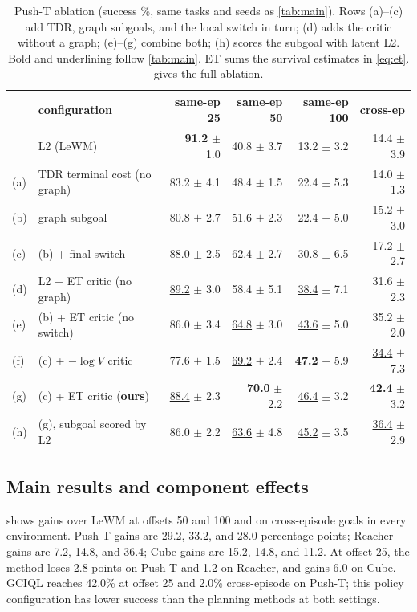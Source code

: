 \documentclass{article}
\theoremstyle{definition}
\theoremstyle{remark}
\begin{document}
\begin{table}[t]
\centering\small\setlength{\tabcolsep}{3pt}
\caption{Push-T ablation (success \%, same tasks and seeds as \cref{tab:main}). Rows (a)--(c) add TDR, graph subgoals, and the local switch in turn; (d) adds the critic without a graph; (e)--(g) combine both; (h) scores the subgoal with latent L2. Bold and underlining follow \cref{tab:main}. ET sums the survival estimates in \cref{eq:et}.  gives the full ablation.}
\label{tab:ablation}
\begin{tabular}{llrrrr}
\toprule
& configuration & same-ep 25 & same-ep 50 & same-ep 100 & cross-ep \\
\midrule
& L2 (LeWM) & \textbf{91.2} $\pm$ 1.0 & 40.8 $\pm$ 3.7 & 13.2 $\pm$ 3.2 & 14.4 $\pm$ 3.9 \\
(a) & TDR terminal cost (no graph) & 83.2 $\pm$ 4.1 & 48.4 $\pm$ 1.5 & 22.4 $\pm$ 5.3 & 14.0 $\pm$ 1.3 \\
(b) & graph subgoal & 80.8 $\pm$ 2.7 & 51.6 $\pm$ 2.3 & 22.4 $\pm$ 5.0 & 15.2 $\pm$ 3.0 \\
(c) & (b) + final switch & \underline{88.0} $\pm$ 2.5 & 62.4 $\pm$ 2.7 & 30.8 $\pm$ 6.5 & 17.2 $\pm$ 2.7 \\
\midrule
(d) & L2 + ET critic (no graph) & \underline{89.2} $\pm$ 3.0 & 58.4 $\pm$ 5.1 & \underline{38.4} $\pm$ 7.1 & 31.6 $\pm$ 2.3 \\
(e) & (b) + ET critic (no switch) & 86.0 $\pm$ 3.4 & \underline{64.8} $\pm$ 3.0 & \underline{43.6} $\pm$ 5.0 & 35.2 $\pm$ 2.0 \\
(f) & (c) + $-\log V$ critic & 77.6 $\pm$ 1.5 & \underline{69.2} $\pm$ 2.4 & \textbf{47.2} $\pm$ 5.9 & \underline{34.4} $\pm$ 7.3 \\
(g) & (c) + ET critic (\textbf{ours}) & \underline{88.4} $\pm$ 2.3 & \textbf{70.0} $\pm$ 2.2 & \underline{46.4} $\pm$ 3.2 & \textbf{42.4} $\pm$ 3.2 \\
(h) & (g), subgoal scored by L2 & 86.0 $\pm$ 2.2 & \underline{63.6} $\pm$ 4.8 & \underline{45.2} $\pm$ 3.5 & \underline{36.4} $\pm$ 2.9 \\
\bottomrule
\end{tabular}
\end{table}

\subsection{Main results and component effects}
\label{sec:main}
 shows gains over LeWM at offsets 50 and 100 and on cross-episode goals
in every environment. Push-T gains are 29.2, 33.2, and 28.0 percentage points;
Reacher gains are 7.2, 14.8, and 36.4; Cube gains are 15.2, 14.8, and 11.2.
At offset 25, the method loses 2.8 points on Push-T and 1.2 on Reacher, and gains
6.0 on Cube. GCIQL reaches 42.0\% at offset 25 and 2.0\% cross-episode on Push-T;
this policy configuration has lower success than the planning methods at both settings.
\end{document}
